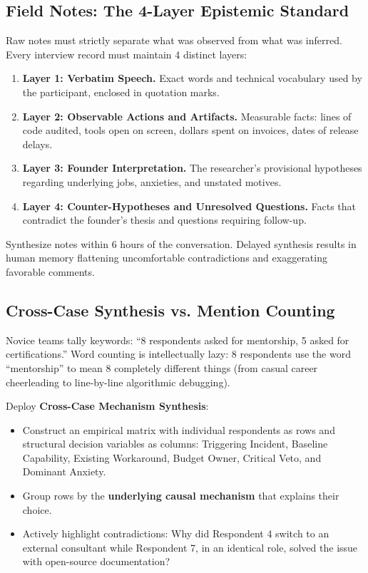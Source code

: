 \subsection{Field Notes: The 4-Layer Epistemic Standard}

Raw notes must strictly separate what was observed from what was inferred. Every interview record must maintain 4 distinct layers:
\begin{enumerate}[leftmargin=1.2em,itemsep=0.2ex]
  \item \textbf{Layer 1: Verbatim Speech.} Exact words and technical vocabulary used by the participant, enclosed in quotation marks.
  \item \textbf{Layer 2: Observable Actions and Artifacts.} Measurable facts: lines of code audited, tools open on screen, dollars spent on invoices, dates of release delays.
  \item \textbf{Layer 3: Founder Interpretation.} The researcher's provisional hypotheses regarding underlying jobs, anxieties, and unstated motives.
  \item \textbf{Layer 4: Counter-Hypotheses and Unresolved Questions.} Facts that contradict the founder's thesis and questions requiring follow-up.
\end{enumerate}

Synthesize notes within 6 hours of the conversation. Delayed synthesis results in human memory flattening uncomfortable contradictions and exaggerating favorable comments.

\subsection{Cross-Case Synthesis vs. Mention Counting}

Novice teams tally keywords: ``8 respondents asked for mentorship, 5 asked for certifications.'' Word counting is intellectually lazy: 8 respondents use the word ``mentorship'' to mean 8 completely different things (from casual career cheerleading to line-by-line algorithmic debugging).

Deploy \textbf{Cross-Case Mechanism Synthesis}:
\begin{itemize}[leftmargin=1.2em,itemsep=0.2ex]
  \item Construct an empirical matrix with individual respondents as rows and structural decision variables as columns: Triggering Incident, Baseline Capability, Existing Workaround, Budget Owner, Critical Veto, and Dominant Anxiety.
  \item Group rows by the \textbf{underlying causal mechanism} that explains their choice.
  \item Actively highlight contradictions: Why did Respondent 4 switch to an external consultant while Respondent 7, in an identical role, solved the issue with open-source documentation?
\end{itemize}

